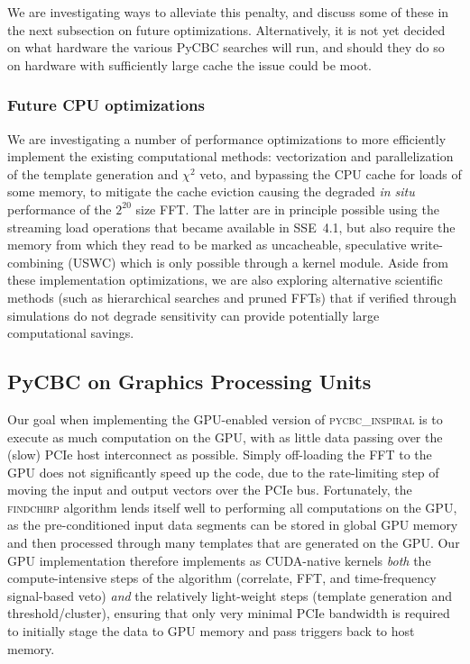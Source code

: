 We are investigating ways to alleviate this penalty, and discuss some of these
in the next subsection on future optimizations. Alternatively, it is not yet
decided on what hardware the various PyCBC searches will run, and should they do
so on hardware with sufficiently large cache the issue could be moot.

\vspace*{-10pt}
\subsubsection{Future CPU optimizations}
\vspace*{-05pt}

We are investigating a number of performance optimizations to more efficiently
implement the existing computational methods: vectorization and parallelization
of the template generation and $\chi^2$ veto, and bypassing the CPU cache for
loads of some memory, to mitigate the cache eviction causing the degraded
\textit{in situ} performance of the $2^{20}$ size FFT. The latter are in
principle possible using the streaming load operations that became available in
SSE~4.1, but also require the memory from which they read to be marked as
uncacheable, speculative write-combining (USWC) which is only possible through a
kernel module. Aside from these implementation optimizations, we are also exploring alternative
scientific methods (such as hierarchical searches and pruned FFTs) that if
verified through simulations do not degrade sensitivity can provide potentially
large computational savings.

\vspace*{-10pt}
\subsection{PyCBC on Graphics Processing Units}
\vspace*{-05pt}
\label{sec:gpu-trade}

Our goal when implementing the GPU-enabled version of \textsc{pycbc\_inspiral}
is to execute as much computation on the GPU, with as little data passing
over the (slow) PCIe host interconnect as possible. Simply off-loading the
FFT to the GPU does not significantly speed up the code, due to the
rate-limiting step of moving the input and output vectors over the PCIe bus.
Fortunately, the \textsc{findchirp} algorithm lends itself well to 
performing all computations on the GPU, as the pre-conditioned input data segments can be stored in global GPU
memory and then processed through many templates that are generated on
the GPU. Our GPU implementation therefore implements as CUDA-native kernels
\emph{both} the compute-intensive steps of the algorithm (correlate, FFT, and
time-frequency signal-based veto) \emph{and} the relatively light-weight steps
(template generation and threshold/cluster), ensuring that only very minimal
PCIe bandwidth is required to initially stage the data to GPU memory and pass
triggers back to host memory. 

